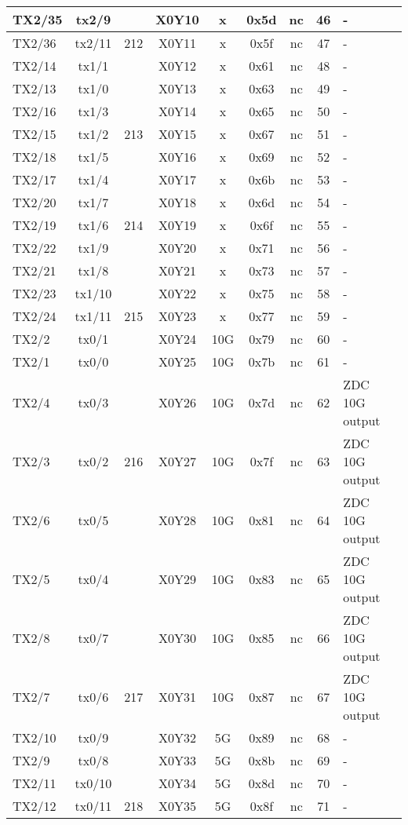 \begin{longtable}{|l|c|c|c|c|c|c|c|l|}
TX2/35 & tx2/9  &     & X0Y10 &  x  & 0x5d & nc & 46 & -\\\hline
TX2/36 & tx2/11 & 212 & X0Y11 &  x  & 0x5f & nc & 47 & -\\\hline
TX2/14 & tx1/1  &     & X0Y12 &  x  & 0x61 & nc & 48 & -\\\hline
TX2/13 & tx1/0  &     & X0Y13 &  x  & 0x63 & nc & 49 & -\\\hline
TX2/16 & tx1/3  &     & X0Y14 &  x  & 0x65 & nc & 50 & -\\\hline
TX2/15 & tx1/2  & 213 & X0Y15 &  x  & 0x67 & nc & 51 & -\\\hline
TX2/18 & tx1/5  &     & X0Y16 &  x  & 0x69 & nc & 52 & -\\\hline
TX2/17 & tx1/4  &     & X0Y17 &  x  & 0x6b & nc & 53 & -\\\hline
TX2/20 & tx1/7  &     & X0Y18 &  x  & 0x6d & nc & 54 & -\\\hline
TX2/19 & tx1/6  & 214 & X0Y19 &  x  & 0x6f & nc & 55 & -\\\hline
TX2/22 & tx1/9  &     & X0Y20 &  x  & 0x71 & nc & 56 & -\\\hline
TX2/21 & tx1/8  &     & X0Y21 &  x  & 0x73 & nc & 57 & -\\\hline
TX2/23 & tx1/10 &     & X0Y22 &  x  & 0x75 & nc & 58 & -\\\hline
TX2/24 & tx1/11 & 215 & X0Y23 &  x  & 0x77 & nc & 59 & -\\\hline
TX2/2  & tx0/1  &     & X0Y24 & 10G & 0x79 & nc & 60 & -\\\hline
TX2/1  & tx0/0  &     & X0Y25 & 10G & 0x7b & nc & 61 & -\\\hline
TX2/4  & tx0/3  &     & X0Y26 & 10G & 0x7d & nc & 62 & ZDC 10G output\\\hline
TX2/3  & tx0/2  & 216 & X0Y27 & 10G & 0x7f & nc & 63 & ZDC 10G output\\\hline
TX2/6  & tx0/5  &     & X0Y28 & 10G & 0x81 & nc & 64 & ZDC 10G output\\\hline
TX2/5  & tx0/4  &     & X0Y29 & 10G & 0x83 & nc & 65 & ZDC 10G output\\\hline
TX2/8  & tx0/7  &     & X0Y30 & 10G & 0x85 & nc & 66 & ZDC 10G output\\\hline
TX2/7  & tx0/6  & 217 & X0Y31 & 10G & 0x87 & nc & 67 & ZDC 10G output\\\hline
TX2/10 & tx0/9  &     & X0Y32 &  5G & 0x89 & nc & 68 & -\\\hline
TX2/9  & tx0/8  &     & X0Y33 &  5G & 0x8b & nc & 69 & -\\\hline
TX2/11 & tx0/10 &     & X0Y34 &  5G & 0x8d & nc & 70 & -\\\hline
TX2/12 & tx0/11 & 218 & X0Y35 &  5G & 0x8f & nc & 71 & -\\\hline
\end{longtable}

